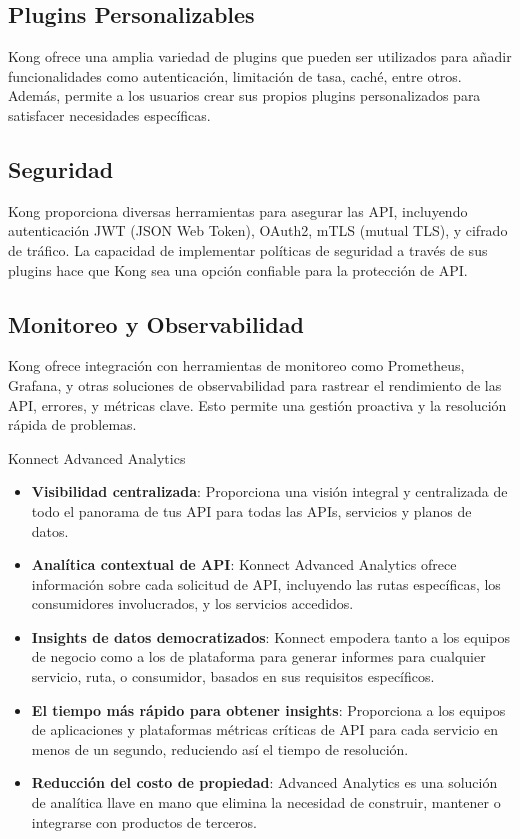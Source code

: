 \subsection{Plugins Personalizables}
Kong ofrece una amplia variedad de plugins que pueden ser utilizados para añadir 
funcionalidades como autenticación, limitación de tasa, caché, entre otros. Además, 
permite a los usuarios crear sus propios plugins personalizados para satisfacer necesidades específicas.

\subsection{Seguridad}
Kong proporciona diversas herramientas para asegurar las API, incluyendo autenticación 
JWT (JSON Web Token), OAuth2, mTLS (mutual TLS), y cifrado de tráfico. 
La capacidad de implementar políticas de seguridad a través de sus plugins 
hace que Kong sea una opción confiable para la protección de API.


\subsection{Monitoreo y Observabilidad}
Kong ofrece integración con herramientas de monitoreo como Prometheus, Grafana, y 
otras soluciones de observabilidad para rastrear el rendimiento de las API, errores,
y métricas clave. Esto permite una gestión proactiva y la resolución rápida de problemas.

Konnect Advanced Analytics


\begin{itemize}
  \item \textbf{Visibilidad centralizada}: Proporciona una visión integral y centralizada de todo el panorama de tus API para todas las APIs, servicios y planos de datos.
  \item \textbf{Analítica contextual de API}: Konnect Advanced Analytics ofrece información sobre cada solicitud de API, incluyendo las rutas específicas, los consumidores involucrados, y los servicios accedidos.
  \item \textbf{Insights de datos democratizados}: Konnect empodera tanto a los equipos de negocio como a los de plataforma para generar informes para cualquier servicio, ruta, o consumidor, basados en sus requisitos específicos.
  \item \textbf{El tiempo más rápido para obtener insights}: Proporciona a los equipos de aplicaciones y plataformas métricas críticas de API para cada servicio en menos de un segundo, reduciendo así el tiempo de resolución.
  \item \textbf{Reducción del costo de propiedad}: Advanced Analytics es una solución de analítica llave en mano que elimina la necesidad de construir, mantener o integrarse con productos de terceros.
\end{itemize}

